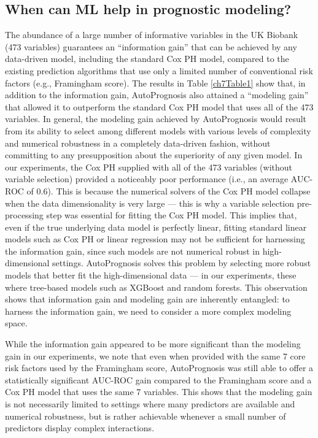 \documentclass [PhD] {uclathes}
\begin{document}
\subsection*{When can ML help in prognostic modeling?}
The abundance of a large number of informative variables in the UK Biobank (473 variables) guarantees an ``information gain'' that can be achieved by any data-driven model, including the standard Cox PH model, compared to the existing prediction algorithms that use only a limited number of conventional risk factors (e.g., Framingham score). The results in Table \ref{ch7Table1} show that, in addition to the information gain, AutoPrognosis also attained a ``modeling gain'' that allowed it to outperform the standard Cox PH model that uses all of the 473 variables. In general, the modeling gain achieved by AutoPrognosis would result from its ability to select among different models with various levels of complexity and numerical robustness in a completely data-driven fashion, without committing to any presupposition about the superiority of any given model. In our experiments, the Cox PH supplied with all of the 473 variables (without variable selection) provided a noticeably poor performance (i.e., an average AUC-ROC of 0.6). This is because the numerical solvers of the Cox PH model collapse when the data dimensionality is very large --- this is why a variable selection pre-processing step was essential for fitting the Cox PH model. This implies that, even if the true underlying data model is perfectly linear, fitting standard linear models such as Cox PH or linear regression may not be sufficient for harnessing the information gain, since such models are not numerical robust in high-dimensional settings. AutoPrognosis solves this problem by selecting more robust models that better fit the high-dimensional data --- in our experiments, these where tree-based models such as XGBoost and random forests. This observation shows that information gain and modeling gain are inherently entangled: to harness the information gain, we need to consider a more complex modeling space.

While the information gain appeared to be more significant than the modeling gain in our experiments, we note that even when provided with the same 7 core risk factors used by the Framingham score, AutoPrognosis was still able to offer a statistically significant AUC-ROC gain compared to the Framingham score and a Cox PH model that uses the same 7 variables. This shows that the modeling gain is not necessarily limited to settings where many predictors are available and numerical robustness, but is rather achievable whenever a small number of predictors display complex interactions.    
\end{document}
